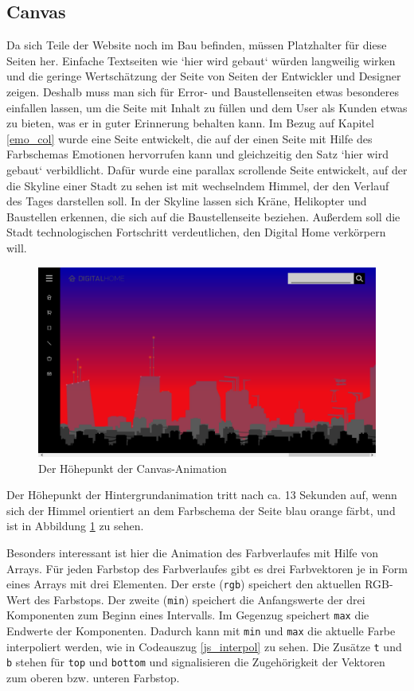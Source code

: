 \subsection{Canvas}
\label{descr_canvas}

Da sich Teile der Website noch im Bau befinden, müssen Platzhalter für diese Seiten her. Einfache Textseiten wie `hier wird gebaut` würden langweilig wirken und die geringe Wertschätzung der Seite von Seiten der Entwickler und Designer zeigen. Deshalb muss man sich für Error- und Baustellenseiten etwas besonderes einfallen lassen, um die Seite mit Inhalt zu füllen und dem User als Kunden etwas zu bieten, was er in guter Erinnerung behalten kann. Im Bezug auf Kapitel \ref{emo_col} wurde eine Seite entwickelt, die auf der einen Seite mit Hilfe des Farbschemas Emotionen hervorrufen kann und gleichzeitig den Satz `hier wird gebaut` verbildlicht. Dafür wurde eine parallax scrollende Seite entwickelt, auf der die Skyline einer Stadt zu sehen ist mit wechselndem Himmel, der den Verlauf des Tages darstellen soll. In der Skyline lassen sich Kräne, Helikopter und Baustellen erkennen, die sich auf die Baustellenseite beziehen. Außerdem soll die Stadt technologischen Fortschritt verdeutlichen, den Digital Home verkörpern will.
\begin{figure} [h]
\includegraphics[width=\textwidth]{./img/js_canvas_highlight.png}
\caption{Der Höhepunkt der Canvas-Animation}
\label{js_canvas_highlight}
\end{figure}
Der Höhepunkt der Hintergrundanimation tritt nach ca. 13 Sekunden auf, wenn sich der Himmel orientiert an dem Farbschema der Seite blau orange färbt, und ist in Abbildung \ref{js_canvas_highlight} zu sehen.

Besonders interessant ist hier die Animation des Farbverlaufes mit Hilfe von Arrays. Für jeden Farbstop des Farbverlaufes gibt es drei Farbvektoren je in Form eines Arrays mit drei Elementen. Der erste (\lstinline{rgb}) speichert den aktuellen RGB-Wert des Farbstops. Der zweite (\lstinline{min}) speichert die Anfangswerte der drei Komponenten zum Beginn eines Intervalls. Im Gegenzug speichert \lstinline{max} die Endwerte der Komponenten. Dadurch kann mit \lstinline{min} und \lstinline{max} die aktuelle Farbe interpoliert werden, wie in Codeauszug \ref{js_interpol} zu sehen. Die Zusätze \lstinline{t} und \lstinline{b} stehen für \lstinline{top} und \lstinline{bottom} und signalisieren die Zugehörigkeit der Vektoren zum oberen bzw. unteren Farbstop.

